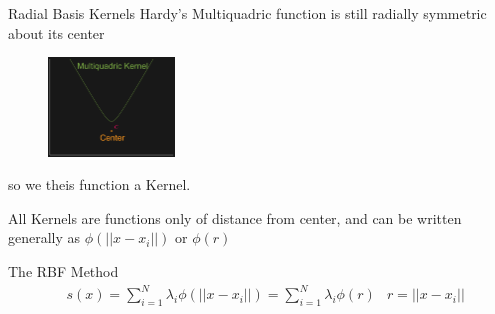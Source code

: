 \documentclass[12pt,t]{beamer}
\newcommand{\subt}[1]{{\footnotesize \color{subtitle} {#1}}}
\begin{document}
\begin{frame}{Radial Basis Kernels}
Hardy's Multiquadric function is still \subt{radially symmetric} about its center


\begin{figure}
\includegraphics[width=0.3\textwidth, keepaspectratio]{fig7.png}
\end{figure}
so we theis function a Kernel. 

All Kernels are functions only of distance from center, and can be written generally as $\phi(||x-x_i||)$ or $\phi(r)$

\subt{The RBF Method}
\begin{align*}
&s(x)=\sum_{i=1}^N \lambda_i \phi(||x-x_i||)=\sum_{i=1}^N \lambda_i \phi(r) &r=||x-x_i||
\end{align*}

\note{}
\end{frame}
\end{document}
